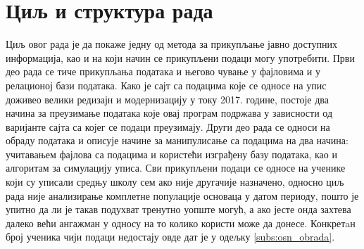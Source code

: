 \section{Циљ и структура рада}

Циљ овог рада је да покаже једну од метода за прикупљање јавно доступних информација, као и на који начин се прикупљени подаци могу употребити. Први део рада се тиче прикупљања података и његово чување у фајловима и у релационој бази података. Како је сајт са подацима које се односе на упис доживео велики редизајн и модернизацију у току 2017. године, постоје два начина за преузимање података које овај програм подржава у зависности од варијанте сајта са којег се подаци преузимају. Други део рада се односи на обраду података и описује начине за манипулисање са подацима на два начина: учитавањем фајлова са подацима и користећи изграђену базу података, као и алгоритам за симулацију уписа. Сви прикупљени подаци се односе на ученике који су уписали средњу школу сем ако није другачије назначено, односно циљ рада није анализирање комплетне популације основаца у датом периоду, пошто је упитно да ли је такав подухват тренутно уопште могућ, а ако јесте онда захтева далеко већи ангажман у односу на то колико користи може да донесе. Конкретaн број ученика чији подаци недостају овде дат је у одељку \ref{subs:osn_obrada}.